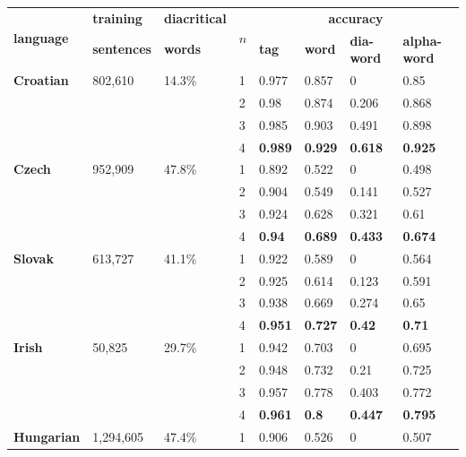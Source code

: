 \documentclass[12pt]{article}
\begin{document}
    \begin{table}
        \begin{tabular}{|l|l|l||l|l|l|l|l|}
            \hline
            \multirow{2}{*}{\textbf{language}} & \textbf{training} & \textbf{diacritical} & \multirow{2}{*}{\textbf{$n$}} &\multicolumn{4}{c|}{\textbf{accuracy}} \\ \cline{5-8}
            & \textbf{sentences} & \textbf{words} & & \textbf{tag} & \textbf{word} & \textbf{dia-word} & \textbf{alpha-word} \\
            \hhline{|=|=|=#=|=|=|=|=|}
            \textbf{Croatian} & 802,610 & 14.3\% & 1 & 0.977 & 0.857 & 0 & 0.85\\ \cline{4-8}
            & & & 2 & 0.98 & 0.874 & 0.206 & 0.868\\ \cline{4-8}
            & & & 3 & 0.985 & 0.903 & 0.491 & 0.898\\ \cline{4-8}
            & & & 4 & \textbf{0.989} & \textbf{0.929} & \textbf{0.618} & \textbf{0.925}\\ \cline{4-8}
            \hline
            \textbf{Czech} & 952,909 & 47.8\% & 1 & 0.892 & 0.522 & 0 & 0.498\\ \cline{4-8}
            & & & 2 & 0.904 & 0.549 & 0.141 & 0.527\\ \cline{4-8}
            & & & 3 & 0.924 & 0.628 & 0.321 & 0.61\\ \cline{4-8}
            & & & 4 & \textbf{0.94} & \textbf{0.689} & \textbf{0.433} & \textbf{0.674}\\ \cline{4-8}
            \hline
            \textbf{Slovak} & 613,727 & 41.1\% & 1 & 0.922 & 0.589 & 0 & 0.564\\ \cline{4-8}
            & & & 2 & 0.925 & 0.614 & 0.123 & 0.591\\ \cline{4-8}
            & & & 3 & 0.938 & 0.669 & 0.274 & 0.65\\ \cline{4-8}
            & & & 4 & \textbf{0.951} & \textbf{0.727} & \textbf{0.42} & \textbf{0.71}\\ \cline{4-8}
            \hline
            \textbf{Irish} & 50,825 & 29.7\% & 1 & 0.942 & 0.703 & 0 & 0.695\\ \cline{4-8}
            & & & 2 & 0.948 & 0.732 & 0.21 & 0.725\\ \cline{4-8}
            & & & 3 & 0.957 & 0.778 & 0.403 & 0.772\\ \cline{4-8}
            & & & 4 & \textbf{0.961} & \textbf{0.8} & \textbf{0.447} & \textbf{0.795}\\ \cline{4-8}
            \hline
            \textbf{Hungarian} & 1,294,605 & 47.4\% & 1 & 0.906 & 0.526 & 0 & 0.507\\ \cline{4-8}

\end{tabular}
\end{table}
\end{document}
